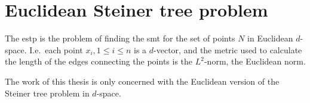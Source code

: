 \section{Euclidean Steiner tree problem}
\label{sec:eucl-stein-tree}

The \gls{estp} is the problem of finding the \gls{smt} for the set of points $N$
in Euclidean $d$-space.  I.e.\ each point $x_{i}, 1 \le i \le n$ is a
$d$-vector, and the metric used to calculate the length of the edges connecting
the points is the $L^2$-norm, the Euclidean norm.

The work of this thesis is only concerned with the Euclidean version of the
Steiner tree problem in $d$-space.

\chapterbreak{}

